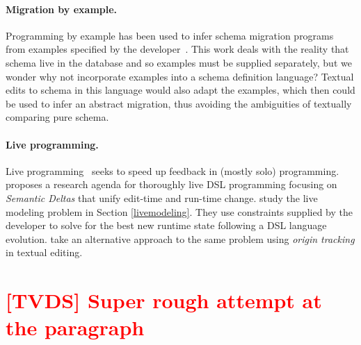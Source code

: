 \documentclass[english,submission]{programming}
\begin{document}
\paragraph{Migration by example.}
Programming by example has been used to infer schema migration programs from examples specified by the developer~\cite{wang20, Alexe11}.
This work deals with the reality that schema live in the database and so examples must be supplied separately, but we wonder why not incorporate examples into a schema definition language? Textual edits to schema in this language would also adapt the examples, which then could be used to infer an abstract migration, thus avoiding the ambiguities of textually comparing pure schema.

\paragraph{Live programming.}
Live programming~\cite{tanimoto90, rein2018exploratory} seeks to speed up feedback in (mostly solo) programming.
\citet{SemanticDeltas} proposes a research agenda for thoroughly live DSL programming focusing on \emph{Semantic Deltas} that unify edit-time and run-time change.
\citet{RuntimeConstraint} study the live modeling problem in Section \ref{livemodeling}. They use constraints supplied by the developer to solve for the best new runtime state following a DSL language evolution. \citet{vanRozen19} take an alternative approach to the same problem using \emph{origin tracking} in textual editing.




%
%
\printbibliography


\appendix

\section{\textcolor{red}{[TVDS] Super rough attempt at the paragraph}}
\end{document}
